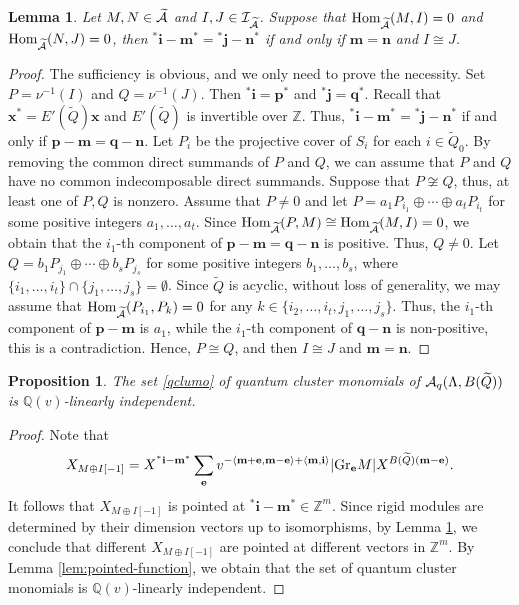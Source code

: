 \documentclass[reqno,12pt]{amsart}
\numberwithin{equation}{section}
\def\lr#1{\langle #1\rangle} \def\fin{\hfill$\square$}  \def\lra{\longrightarrow} \def\mod{\mbox{\rm \textbf{mod}}\,}\def\Mod{\mbox{\rm mod}\,}\def\top{\mbox{\rm top}\,}\def\soc{\mbox{\rm soc}\,}
\theoremstyle{plain} %
\newtheorem{lemma}[theorem]{\bf Lemma}
\newtheorem{proposition}[theorem]{\bf Proposition}
\theoremstyle{definition} %
\begin{document}
\begin{lemma}\label{lem:pointed-vector-iso}
    Let $M,N\in \widetilde{\mathcal{A}}$ and $I,J\in \mathcal{I}_{\widetilde{\mathcal{A}}}$. Suppose that $\mbox{\rm Hom}_{\widetilde{\mathcal{A}}}(M,I)=0$ and $\mbox{\rm Hom}_{\widetilde{\mathcal{A}}}(N,J)=0$, then ${^\ast\mathbf{i}}-\mathbf{m}^\ast={^\ast\mathbf{j}}-\mathbf{n}^\ast$ if and only if $\mathbf{m}=\mathbf{n}$ and $I\cong J$.
\end{lemma}
\begin{proof}
The sufficiency is obvious, and we only need to prove the necessity.
Set $P=\nu^{-1}(I)$ and $Q=\nu^{-1}(J)$. Then $^\ast \mathbf{i}=\mathbf{p}^\ast$ and $^\ast \mathbf{j}=\mathbf{q}^\ast$.
Recall that $\mathbf{x}^\ast=E'(\widetilde{Q})\mathbf{x}$ and $E'(\widetilde{Q})$ is invertible over $\mathbb{Z}$. Thus, ${^\ast\mathbf{i}}-\mathbf{m}^\ast={^\ast\mathbf{j}}-\mathbf{n}^\ast$ if and only if $\mathbf{p}-\mathbf{m}=\mathbf{q}-\mathbf{n}$. Let $P_i$ be the projective cover of $S_i$ for each $i\in \widetilde{Q}_0$. By removing the common direct summands of $P$ and $Q$, we can assume that $P$ and $Q$ have no common indecomposable direct summands.
Suppose that $P\not \cong Q$, thus, at least one of $P,Q$ is nonzero.  Assume that $P\neq 0$ and let $P=a_1P_{i_1}\oplus \cdots\oplus a_tP_{i_t}$ for some positive integers $a_1,\ldots, a_t$. Since $\mbox{\rm Hom}_{\widetilde{\mathcal{A}}}(P,M)\cong\mbox{\rm Hom}_{\widetilde{\mathcal{A}}}(M,I)=0$, we obtain that the $i_1$-th component of $\mathbf{p}-\mathbf{m}=\mathbf{q}-\mathbf{n}$ is positive. Thus, $Q\neq 0$. Let $Q=b_1P_{j_1}\oplus \cdots\oplus b_sP_{j_s}$ for some positive integers $b_1,\ldots, b_s$, where $\{i_1,\ldots, i_t\}\cap \{j_1,\ldots, j_s\}=\emptyset$. Since $\widetilde{Q}$ is acyclic, without loss of generality, we may assume that $\mbox{\rm Hom}_{\widetilde{\mathcal{A}}}(P_{i_1},P_{k})=0$ for any $k\in \{i_2,\ldots, i_t,j_1,\ldots, j_s\}$. Thus, the $i_1$-th component of $\mathbf{p}-\mathbf{m}$ is $a_1$, while the $i_1$-th component of $\mathbf{q}-\mathbf{n}$ is non-positive, this is a contradiction. Hence, $P\cong Q$, and then $I\cong J$ and $\mathbf{m}=\mathbf{n}$.
\end{proof}

\begin{proposition}\label{xjlm}
The set \eqref{qclumo} of quantum cluster monomials of $\mathcal{A}_q(\Lambda, B(\widetilde{Q}))$
is $\mathbb{Q}(v)$-linearly independent.
\end{proposition}
\begin{proof}
Note that
$$X_{M\oplus I[-1]}=X^{{^\ast\mathbf{i}}-\mathbf{m}^\ast}\sum\limits_{\bf e}v^{-\lr{{\bf m}+\mathbf{e},{\bf m}-\mathbf{e}}+\lr{{\bf m},{\bf i}}}|\mathrm{Gr}_{\mathbf{e}}M|
X^{B(\widetilde{Q})(\mathbf{m}-\mathbf{e})}.$$
It follows that $X_{M\oplus I[-1]}$ is pointed at ${^\ast\mathbf{i}}-\mathbf{m}^\ast\in \mathbb{Z}^{m}$. Since rigid modules are determined by their dimension vectors up to isomorphisms, by Lemma \ref{lem:pointed-vector-iso}, we conclude that different $X_{M\oplus I[-1]}$ are pointed at different vectors in $\mathbb{Z}^m$. By Lemma \ref{lem:pointed-function}, we obtain that the set of quantum cluster monomials is $\mathbb{Q}(v)$-linearly independent.
\end{proof}
\end{document}
